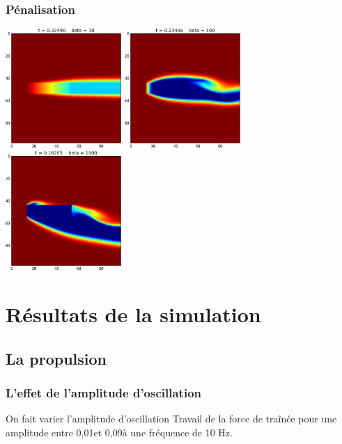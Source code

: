 \documentclass{beamer}
\begin{document}
  \begin{frame}
    \frametitle{Pénalisation}
    \begin{center}
      \includegraphics[width=0.33\textwidth]{penalisation_10.png}
      \includegraphics[width=0.33\textwidth]{penalisation_100.png}
      \includegraphics[width=0.33\textwidth]{penalisation_1000.png}
    \end{center}
  \end{frame}
\section{Résultats de la simulation}
 
 \subsection{La propulsion}
 		
 	\begin{frame}
 		\frametitle{L'effet de l'amplitude d'oscillation}
 			On fait varier l'amplitude d'oscillation
 			Travail de la force de traînée pour une amplitude entre 0,01\degre et 0,09\degre à une fréquence de 10 Hz.
 	\end{frame}
 	
\end{document}
